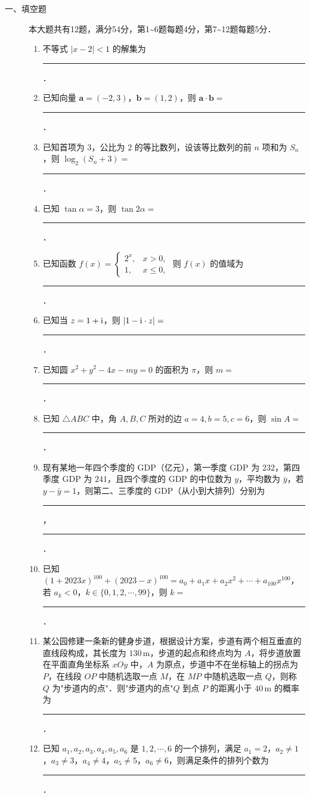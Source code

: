 \begin{description}
    \item[一、填空题] 本大题共有12题，满分54分，第1\textasciitilde6题每题4分，第7\textasciitilde12题每题5分．
    \begin{enumerate}[leftmargin=5pt]
        \item 不等式 $|x-2|<1$ 的解集为 \rule[-0.3ex]{3em}{0.4pt}．
        \item 已知向量 $\bm a=(-2,3)$，$\bm b=(1,2)$，则 $\bm a\cdot\bm b=$ \rule[-0.3ex]{3em}{0.4pt}．
        \item 已知首项为 $3$，公比为 $2$ 的等比数列，设该等比数列的前 $n$ 项和为 $S_n$，则 $\log_2(S_n+3)=$ \rule[-0.3ex]{3em}{0.4pt}．
        \item 已知 $\tan\alpha=3$，则 $\tan2\alpha=$ \rule[-0.3ex]{3em}{0.4pt}．
        \item 已知函数 $f(x)=\begin{cases}2^x,&x>0,\\1,&x\leqslant0,\end{cases}$ 则 $f(x)$ 的值域为 \rule[-0.3ex]{3em}{0.4pt}．
        \item 已知当 $z=1+\mathrm{i}$，则 $|1-\mathrm{i}\cdot z|=$ \rule[-0.3ex]{3em}{0.4pt}．
        \item 已知圆 $x^2+y^2-4x-my=0$ 的面积为 $\pi$，则 $m=$ \rule[-0.3ex]{3em}{0.4pt}．
        \item 已知 $\triangle ABC$ 中，角 $A,B,C$ 所对的边 $a=4,b=5,c=6$，则 $\sin A=$ \rule[-0.3ex]{3em}{0.4pt}．
        \item 现有某地一年四个季度的 GDP（亿元），第一季度 GDP 为 $232$，第四季度 GDP 为 $241$，且四个季度的 GDP 的中位数为 $y$，平均数为 $\bar{y}$，若 $y-\bar{y}=1$，则第二、三季度的 GDP（从小到大排列）分别为 \rule[-0.3ex]{3em}{0.4pt}，\rule[-0.3ex]{3em}{0.4pt}．
        \item 已知 $(1+2023x)^{100}+(2023-x)^{100}=a_0+a_1x+a_2x^2+\cdots+a_{100}x^{100}$，若 $a_k<0$，$k\in\{0,1,2,\cdots,99\}$，则 $k=$ \rule[-0.3ex]{3em}{0.4pt}．
        \item 某公园修建一条新的健身步道，根据设计方案，步道有两个相互垂直的直线段构成，其长度为 $130\,\text{m}$，步道的起点和终点均为 $A$，将步道放置在平面直角坐标系 $xOy$ 中，$A$ 为原点，步道中不在坐标轴上的拐点为 $P$，在线段 $OP$ 中随机选取一点 $M$，在 $MP$ 中随机选取一点 $Q$，则称 $Q$ 为"步道内的点"．则"步道内的点"$Q$ 到点 $P$ 的距离小于 $40\,\text{m}$ 的概率为 \rule[-0.3ex]{3em}{0.4pt}．
        \item 已知 $a_1,a_2,a_3,a_4,a_5,a_6$ 是 $1,2,\cdots,6$ 的一个排列，满足 $a_1=2$，$a_2\neq1$，$a_3\neq3$，$a_4\neq4$，$a_5\neq5$，$a_6\neq6$，则满足条件的排列个数为 \rule[-0.3ex]{3em}{0.4pt}．
    \end{enumerate}
\end{description}

